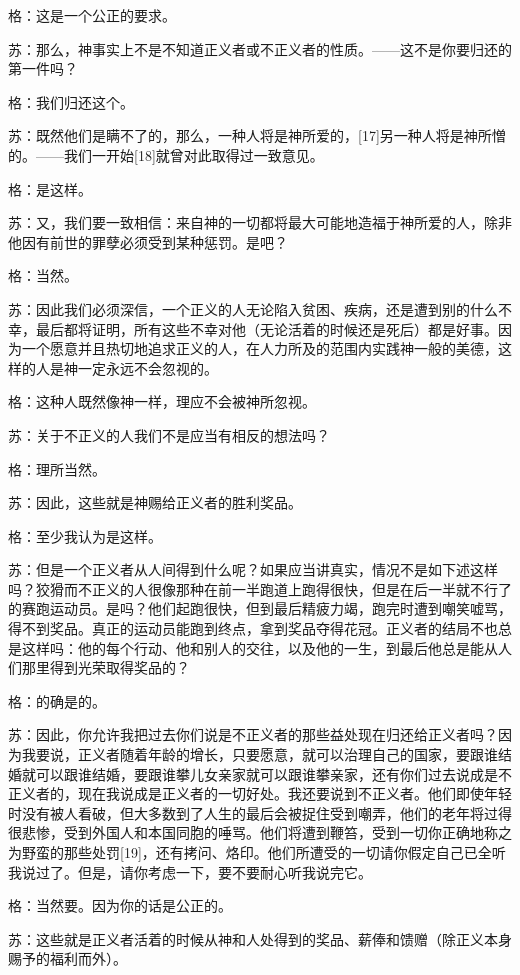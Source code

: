 \documentclass[12pt,oneside]{book}
\begin{document}
格：这是一个公正的要求。

苏：那么，神事实上不是不知道正义者或不正义者的性质。——这不是你要归还的第一件吗？

格：我们归还这个。

苏：既然他们是瞒不了的，那么，一种人将是神所爱的，[17]另一种人将是神所憎的。——我们一开始[18]就曾对此取得过一致意见。

格：是这样。

苏：又，我们要一致相信：来自神的一切都将最大可能地造福于神所爱的人，除非他因有前世的罪孽必须受到某种惩罚。是吧？

格：当然。

苏：因此我们必须深信，一个正义的人无论陷入贫困、疾病，还是遭到别的什么不幸，最后都将证明，所有这些不幸对他（无论活着的时候还是死后）都是好事。因为一个愿意并且热切地追求正义的人，在人力所及的范围内实践神一般的美德，这样的人是神一定永远不会忽视的。

格：这种人既然像神一样，理应不会被神所忽视。

苏：关于不正义的人我们不是应当有相反的想法吗？

格：理所当然。

苏：因此，这些就是神赐给正义者的胜利奖品。

格：至少我认为是这样。

苏：但是一个正义者从人间得到什么呢？如果应当讲真实，情况不是如下述这样吗？狡猾而不正义的人很像那种在前一半跑道上跑得很快，但是在后一半就不行了的赛跑运动员。是吗？他们起跑很快，但到最后精疲力竭，跑完时遭到嘲笑嘘骂，得不到奖品。真正的运动员能跑到终点，拿到奖品夺得花冠。正义者的结局不也总是这样吗：他的每个行动、他和别人的交往，以及他的一生，到最后他总是能从人们那里得到光荣取得奖品的？

格：的确是的。

苏：因此，你允许我把过去你们说是不正义者的那些益处现在归还给正义者吗？因为我要说，正义者随着年龄的增长，只要愿意，就可以治理自己的国家，要跟谁结婚就可以跟谁结婚，要跟谁攀儿女亲家就可以跟谁攀亲家，还有你们过去说成是不正义者的，现在我说成是正义者的一切好处。我还要说到不正义者。他们即使年轻时没有被人看破，但大多数到了人生的最后会被捉住受到嘲弄，他们的老年将过得很悲惨，受到外国人和本国同胞的唾骂。他们将遭到鞭笞，受到一切你正确地称之为野蛮的那些处罚[19]，还有拷问、烙印。他们所遭受的一切请你假定自己已全听我说过了。但是，请你考虑一下，要不要耐心听我说完它。

格：当然要。因为你的话是公正的。

苏：这些就是正义者活着的时候从神和人处得到的奖品、薪俸和馈赠（除正义本身赐予的福利而外）。
\end{document}
